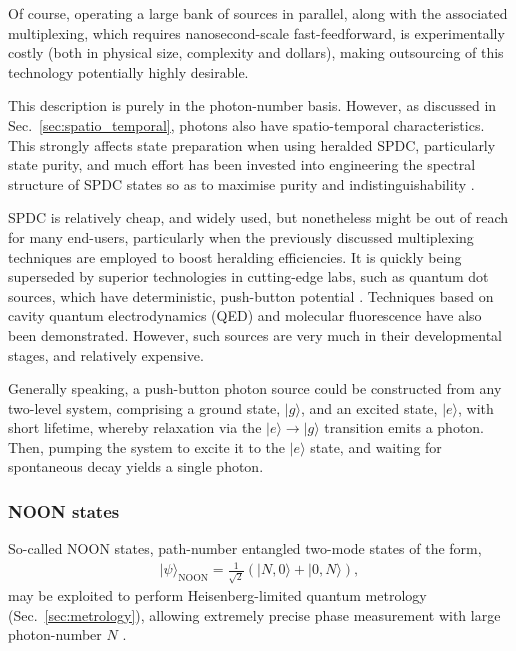\documentclass[aps,rmp,twocolumn,amsmath,amssymb,nofootinbib,superscriptaddress,longbibliography,floatfix,table-of-contents,eqsecnum]{revtex4-1}
\newcommand{\ket}[1]{|#1\rangle}
\begin{document}
Of course, operating a large bank of sources in parallel, along with the associated multiplexing, which requires nanosecond-scale fast-feedforward, is experimentally costly (both in physical size, complexity and dollars), making outsourcing of this technology potentially highly desirable.

This description is purely in the photon-number basis. However, as discussed in Sec.~\ref{sec:spatio_temporal}, photons also have spatio-temporal characteristics. This strongly affects state preparation when using heralded SPDC, particularly state purity, and much effort has been invested into engineering the spectral structure of SPDC states so as to maximise purity and indistinguishability \cite{bib:Aichele02, bib:Branning00}.

SPDC is relatively cheap, and widely used, but nonetheless might be out of reach for many end-users, particularly when the previously discussed multiplexing techniques are employed to boost heralding efficiencies. It is quickly being superseded by superior technologies in cutting-edge labs, such as quantum dot sources, which have deterministic, push-button potential \cite{bib:Santori01, bib:Kiraz04}. Techniques based on cavity quantum electrodynamics (QED) \cite{bib:Brattke01} and molecular fluorescence \cite{bib:Brunel99} have also been demonstrated. However, such sources are very much in their developmental stages, and relatively expensive.

Generally speaking, a push-button photon source could be constructed from any two-level system, comprising a ground state, $\ket{g}$, and an excited state, $\ket{e}$, with short lifetime, whereby relaxation via the \mbox{$\ket{e}\to\ket{g}$} transition emits a photon. Then, pumping the system to excite it to the $\ket{e}$ state, and waiting for spontaneous decay yields a single photon.

%
%

\subsubsection{NOON states} \label{sec:NOON} 

So-called NOON states, path-number entangled two-mode states of the form,
\begin{align}
\ket\psi_\text{NOON} = \frac{1}{\sqrt{2}}(\ket{N,0}+\ket{0,N}),
\end{align}
may be exploited to perform Heisenberg-limited quantum metrology (Sec.~\ref{sec:metrology}), allowing extremely precise phase measurement with large photon-number $N$ \cite{bib:Dowling08}. 
\end{document}
